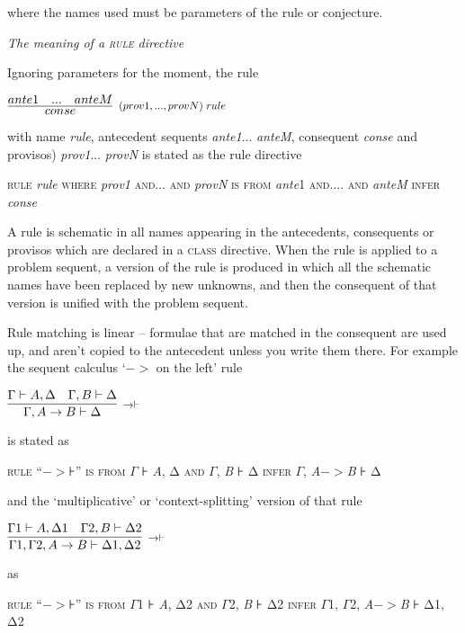 \documentclass[11pt]{book}
\newcommand{\reason}[1]{\scalebox{0.85}{#1}}
\begin{document}
where the names used must be parameters of the rule or conjecture.


\textit{The meaning of a \textsc{rule} directive}


Ignoring parameters for the moment, the rule


$\infer[\reason{$(prov1,...,provN)\;rule$}]
       {conse}
       {ante1\quad ...\quad anteM}$

with name \textit{rule}, antecedent sequents \textit{ante1}... \textit{anteM}, consequent \textit{conse} and provisos) \textit{prov1}... \textit{provN} is stated as the rule directive


\textsc{rule} \textit{rule} \textsc{where} \textit{prov1} \textsc{and... and} \textit{provN} \textsc{is from} \textit{ante}1 \textsc{and.... and} \textit{anteM} \textsc{infer} \textit{conse}


A rule is schematic in all names appearing in the antecedents, consequents or provisos which are declared in a \textsc{class} directive. When the rule is applied to a problem sequent, a version of the rule is produced in which all the schematic names have been replaced by new unknowns, and then the consequent of that version is unified with the problem sequent.


Rule matching is linear -- formulae that are matched in the consequent are used up, and aren't copied to the antecedent unless you write them there. For example the sequent calculus `\ensuremath{->} on the left' rule


$\infer[\reason{$->|- $}]
       {\Gamma,A->B |- \Delta }
       {\Gamma  |- A,\Delta \quad \Gamma,B |- \Delta }$

is stated as


\textsc{rule} ``\ensuremath{->}⊦'' \textsc{is from} \textsc{\ensuremath{\Gamma}} \textsc{⊦} \textit{A}, Δ \textsc{and} \textsc{\ensuremath{\Gamma}}\textsc{,} \textit{B} ⊦ Δ \textsc{infer} \textsc{\ensuremath{\Gamma}}, \textit{A}\ensuremath{->}\textit{B} ⊦ Δ


and the `multiplicative' or `context-splitting' version of that rule


$\infer[\reason{$->|- $}]
       {\Gamma 1,\Gamma 2,A->B |- \Delta 1,\Delta 2}
       {\Gamma 1 |- A,\Delta 1\quad \Gamma 2,B |- \Delta 2}$

as


\textsc{rule} ``\ensuremath{->}⊦'' \textsc{is from} \textsc{\ensuremath{\Gamma}1} \textsc{⊦} \textit{A}, Δ2 \textsc{and} \textsc{\ensuremath{\Gamma}2}\textsc{,} \textit{B} ⊦ Δ2 \textsc{infer} \textsc{\ensuremath{\Gamma}1, \ensuremath{\Gamma}2}, \textit{A}\ensuremath{->}\textit{B} ⊦ Δ1, Δ2
\end{document}
